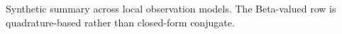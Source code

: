 \begin{table}[!htbp]
\centering
\small
\resizebox{0.88\textwidth}{!}{}
\caption{Synthetic summary across local observation models. The Beta-valued row is quadrature-based rather than closed-form conjugate.}
\label{tab:family-result-paper}
\end{table}
